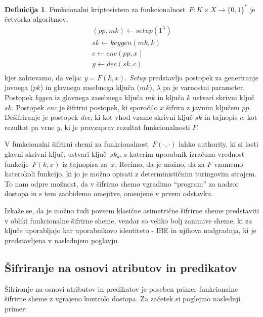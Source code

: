 \documentclass[12pt,a4paper,openany,tikz]{book}
\theoremstyle{plain}
\theoremstyle{definition}
\newtheorem{defn}[thm]{Definicija} %
\begin{document}
\begin{mdframed}[frametitle={Funkcionalni kriptosistem}]
\begin{defn}
Funkcionalni kriptosistem za funkcionalnost~$F: K \times X \rightarrow {\{}0,1{\}}^*$ je četvorka algoritmov:
\begin{align*}
  (pp, mk) \leftarrow setup(1^\lambda) \\
  sk \leftarrow keygen(mk, k) \\
  c \leftarrow enc(pp, x)  \\
  y \leftarrow dec(sk, c)  \\
\end{align*}
kjer zahtevamo, da velja: $y=F(k, x)$.
\textit{Setup} predstavlja postopek za generiranje javnega ($pk$) in glavnega zasebnega ključa ($mk$), $\lambda$ pa je varnostni parameter. Postopek \textit{kygen} iz glavnega zasebnega ključa $mk$ in ključa $k$ ustvari skrivni ključ $sk$. Postopek \textit{enc} je šifrirni postopek, ki sporočilo $x$ šifrira z javnim ključem $pp$. Dešifriranje je postopek \textit{dec}, ki kot vhod vzame skrivni ključ $sk$ in tajnopis $c$, kot rezultat pa vrne $y$, ki je pravzaprav rezultat funkcionalnosti $F$.
\label{def:funcs}
\end{defn}
\end{mdframed}

V funkcionalni šifrirni shemi za funkcionalnost~$F(\cdot, \cdot)$ lahko \gls{authority}, ki si lasti glavni skrivni ključ, ustvari ključ~$sk_k$, s katerim uporabnik izračuna vrednost funkcije~$F(k, x)$ iz tajnopisa za~$x$. Recimo, da je možno, da za $F$ vzamemo katerokoli funkcijo, ki jo je možno opisati z determinističnim turingovim strojem. To nam odpre možnost, da v šifrirno shemo vgradimo ``program'' za nadzor dostopa in s tem zaobidemo omejitve, omenjene v prvem odstavku.

Izkaže se, da je možno tudi povsem klasične asimetrične šifrirne sheme predstaviti v obliki funkcionalne šifrirne sheme, vendar so veliko bolj zanimive sheme, ki za ključe uporabljajo kar uporabnikovo identiteto - \gls{IBE} in njihova nadgradnja, ki je predstavljena v naslednjem poglavju.

\subsection{Šifriranje na osnovi atributov in predikatov}
\label{sub:Šifriranje na osnovi atributov in predikatov}

Šifriranje na osnovi atributov in predikatov je poseben primer funkcionalne šifrirne sheme z vgrajeno kontrolo dostopa. Za začetek si poglejmo naslednji primer:
\end{document}
